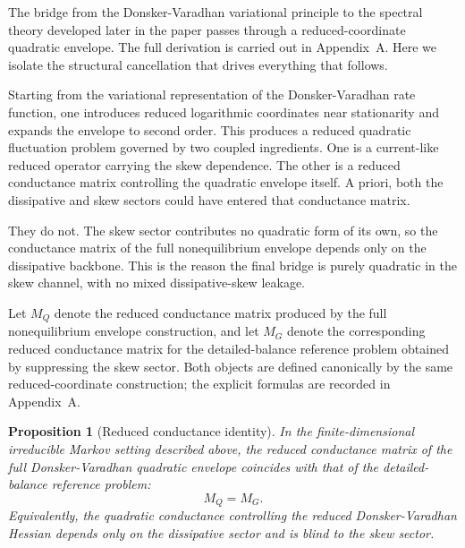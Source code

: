 \documentclass[11pt,a4paper]{article}
\numberwithin{equation}{section}
\theoremstyle{thmcompact}
\newtheorem{proposition}[theorem]{Proposition}
\theoremstyle{remark}
\begin{document}
The bridge from the Donsker-Varadhan variational principle to the spectral theory developed later in the paper passes through a reduced-coordinate quadratic envelope. The full derivation is carried out in Appendix~A. Here we isolate the structural cancellation that drives everything that follows.

Starting from the variational representation of the Donsker-Varadhan rate function, one introduces reduced logarithmic coordinates near stationarity and expands the envelope to second order. This produces a reduced quadratic fluctuation problem governed by two coupled ingredients. One is a current-like reduced operator carrying the skew dependence. The other is a reduced conductance matrix controlling the quadratic envelope itself. A priori, both the dissipative and skew sectors could have entered that conductance matrix.

They do not. The skew sector contributes no quadratic form of its own, so the conductance matrix of the full nonequilibrium envelope depends only on the dissipative backbone. This is the reason the final bridge is purely quadratic in the skew channel, with no mixed dissipative-skew leakage.

Let \(M_Q\) denote the reduced conductance matrix produced by the full nonequilibrium envelope construction, and let \(M_G\) denote the corresponding reduced conductance matrix for the detailed-balance reference problem obtained by suppressing the skew sector. Both objects are defined canonically by the same reduced-coordinate construction; the explicit formulas are recorded in Appendix~A.

\begin{proposition}[Reduced conductance identity]
\label{prop:reduced_conductance_identity}
In the finite-dimensional irreducible Markov setting described above, the reduced conductance matrix of the full Donsker-Varadhan quadratic envelope coincides with that of the detailed-balance reference problem:
\begin{equation}
M_Q=M_G.
\end{equation}
Equivalently, the quadratic conductance controlling the reduced Donsker-Varadhan Hessian depends only on the dissipative sector and is blind to the skew sector.
\end{proposition}
\end{document}
